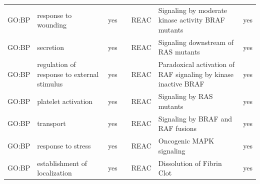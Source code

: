 \begin{longtable}{@{}lp{5cm}lllp{5cm}l@{}}
GO:BP           & response to wounding                                                                                                               & yes              &           & REAC            & Signaling by moderate kinase activity BRAF mutants                                                                                                                     & yes              \\
GO:BP           & secretion                                                                                                                          & yes              &           & REAC            & Signaling downstream of RAS mutants                                                                                                                                    & yes              \\
GO:BP           & regulation of response to external stimulus                                                                                        & yes              &           & REAC            & Paradoxical activation of RAF signaling by kinase inactive BRAF                                                                                                        & yes              \\
GO:BP           & platelet activation                                                                                                                & yes              &           & REAC            & Signaling by RAS mutants                                                                                                                                               & yes              \\
GO:BP           & transport                                                                                                                          & yes              &           & REAC            & Signaling by BRAF and RAF fusions                                                                                                                                      & yes              \\
GO:BP           & response to stress                                                                                                                 & yes              &           & REAC            & Oncogenic MAPK signaling                                                                                                                                               & yes              \\
GO:BP           & establishment of localization                                                                                                      & yes              &           & REAC            & Dissolution of Fibrin Clot                                                                                                                                             & yes              \\

\end{longtable}
